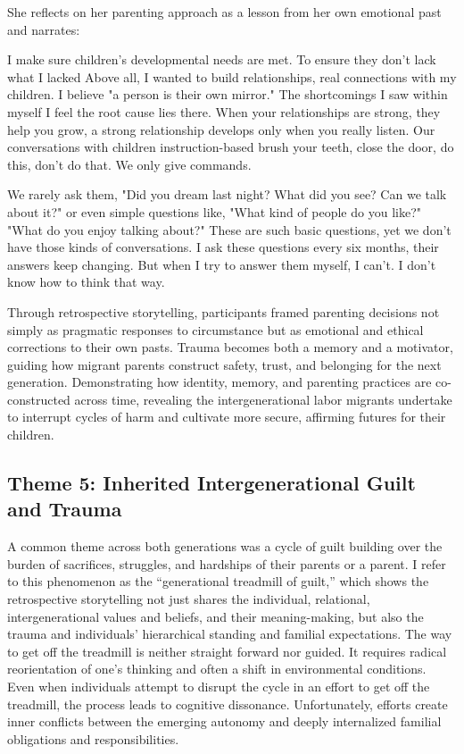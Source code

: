 She reflects on her parenting approach as a lesson from her own emotional past and narrates:
\begin{FoundPoem}
I make sure
children’s developmental needs are met. 
To ensure they don’t lack what I lacked
Above all, 
I wanted to build relationships, 
real connections with my children.
I believe "a person is their own mirror."
The shortcomings I saw within myself
I feel the root cause lies there.
When your relationships are strong,
they help you grow,  
a strong relationship develops only when you really listen.
Our conversations with children 
instruction-based
brush your teeth, close the door, do this, don’t do that. 
We only give commands. 

We rarely ask them, 
"Did you dream last night? What did you see? Can we talk about it?"
or even simple questions like,
"What kind of people do you like?"
"What do you enjoy talking about?"
These are such basic questions, 
yet we don't have those kinds of conversations.
I ask these questions every six months,
their answers keep changing.
But when I try to answer them myself,
I can't.
I don't know how to think that way.
\end{FoundPoem}

Through retrospective storytelling, participants framed parenting decisions not simply as pragmatic responses to circumstance but as emotional and ethical corrections to their own pasts. Trauma becomes both a memory and a motivator, guiding how migrant parents construct safety, trust, and belonging for the next generation. Demonstrating how identity, memory, and parenting practices are co-constructed across time, revealing the intergenerational labor migrants undertake to interrupt cycles of harm and cultivate more secure, affirming futures for their children.

\subsection{Theme 5: Inherited Intergenerational Guilt and Trauma}

A common theme across both generations was a cycle of guilt building over the burden of sacrifices, struggles, and hardships of their parents or a parent. I refer to this phenomenon as the ``generational treadmill of guilt,'' which shows the retrospective storytelling not just shares the individual, relational, intergenerational values and beliefs, and their meaning-making, but also the trauma and individuals’ hierarchical standing and familial expectations. The way to get off the treadmill is neither straight forward nor guided. It requires radical reorientation of one’s thinking and often a shift in environmental conditions. Even when individuals attempt to disrupt the cycle in an effort to get off the treadmill, the process leads to cognitive dissonance. Unfortunately, efforts create inner conflicts between the emerging autonomy and deeply internalized familial obligations and responsibilities.

